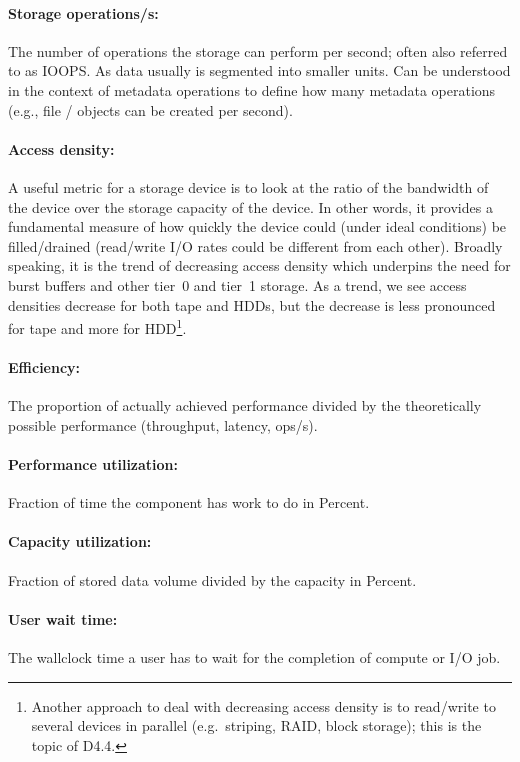 \paragraph{Storage operations/s:}
The number of operations the storage can perform per second; often also referred to as IOOPS.
As data usually is segmented into smaller units.
Can be understood in the context of metadata operations to define how many metadata operations (e.g., file / objects can be created per second).

\paragraph{Access density:}
A useful metric for a storage device is to look at the ratio of the bandwidth of the device over the storage capacity of the device.  In other words, it provides a fundamental measure of how quickly the device could (under ideal conditions) be filled/drained (read/write I/O rates could be different from each other).  Broadly speaking, it is the trend of decreasing access density which underpins the need for burst buffers and other tier~0 and tier~1 storage.  As a trend, we see access densities decrease for both tape and HDDs, but the decrease is less pronounced for tape and more for HDD\footnote{Another approach to deal with decreasing access density is to read/write to several devices in parallel (e.g.\ striping, RAID, block storage); this is the topic of D4.4.}.


\paragraph{Efficiency:}
The proportion of actually achieved performance divided by the theoretically possible performance (throughput, latency, ops/s).

\paragraph{Performance utilization:}
Fraction of time the component has work to do in Percent.


\paragraph{Capacity utilization:}
Fraction of stored data volume divided by the capacity in Percent.


\paragraph{User wait time:}
The wallclock time a user has to wait for the completion of compute or I/O job.



